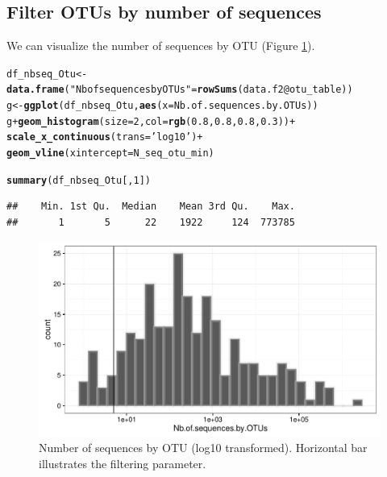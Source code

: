 \documentclass[12pt]{article}\usepackage[]{graphicx}\usepackage[]{color}
\makeatletter
\def\maxwidth{ %
  \ifdim\Gin@nat@width>\linewidth
    \linewidth
  \else
    \Gin@nat@width
  \fi
}
\newcommand{\hlnum}[1]{\textcolor[rgb]{0.686,0.059,0.569}{#1}}%
\newcommand{\hlstr}[1]{\textcolor[rgb]{0.192,0.494,0.8}{#1}}%
\newcommand{\hlopt}[1]{\textcolor[rgb]{0,0,0}{#1}}%
\newcommand{\hlstd}[1]{\textcolor[rgb]{0.345,0.345,0.345}{#1}}%
\newcommand{\hlkwb}[1]{\textcolor[rgb]{0.69,0.353,0.396}{#1}}%
\newcommand{\hlkwc}[1]{\textcolor[rgb]{0.333,0.667,0.333}{#1}}%
\newcommand{\hlkwd}[1]{\textcolor[rgb]{0.737,0.353,0.396}{\textbf{#1}}}%
\newenvironment{kframe}{%
 \def\at@end@of@kframe{}%
 \ifinner\ifhmode%
  \def\at@end@of@kframe{\end{minipage}}%
  \begin{minipage}{\columnwidth}%
 \fi\fi%
 \def\FrameCommand##1{\hskip\@totalleftmargin \hskip-\fboxsep
 \colorbox{shadecolor}{##1}\hskip-\fboxsep
     \hskip-\linewidth \hskip-\@totalleftmargin \hskip\columnwidth}%
 \MakeFramed {\advance\hsize-\width
   \@totalleftmargin\z@ \linewidth\hsize
   \@setminipage}}%
 {\par\unskip\endMakeFramed%
 \at@end@of@kframe}
\newenvironment{knitrout}{}{} %
\numberwithin{figure}{section}
\makeatother
\begin{document}
 \subsection{Filter OTUs by number of sequences}

 We can visualize the number of sequences by OTU (Figure \ref{fig:nbseq_Otu}).

\begin{knitrout}\small
{}\color{fgcolor}\begin{kframe}
\begin{alltt}
\hlstd{df_nbseq_Otu} \hlkwb{<-} \hlkwd{data.frame}\hlstd{(}\hlstr{"Nb of sequences by OTUs"} \hlstd{=} \hlkwd{rowSums}\hlstd{(data.f2}\hlopt{@}\hlkwc{otu_table}\hlstd{))}
\hlstd{g} \hlkwb{<-} \hlkwd{ggplot}\hlstd{(df_nbseq_Otu,} \hlkwd{aes}\hlstd{(}\hlkwc{x} \hlstd{= Nb.of.sequences.by.OTUs))}
\hlstd{g} \hlopt{+} \hlkwd{geom_histogram}\hlstd{(}\hlkwc{size} \hlstd{=} \hlnum{2}\hlstd{,} \hlkwc{col} \hlstd{=} \hlkwd{rgb}\hlstd{(}\hlnum{0.8}\hlstd{,} \hlnum{0.8}\hlstd{,} \hlnum{0.8}\hlstd{,} \hlnum{0.3}\hlstd{))} \hlopt{+}
  \hlkwd{scale_x_continuous}\hlstd{(}\hlkwc{trans} \hlstd{=} \hlstr{'log10'}\hlstd{)} \hlopt{+}
  \hlkwd{geom_vline}\hlstd{(}\hlkwc{xintercept}\hlstd{= N_seq_otu_min)}
\end{alltt}


{\ttfamily\noindent\itshape\color{messagecolor}{\#\# `stat\_bin()` using `bins = 30`. Pick better value with `binwidth`.}}\begin{alltt}
\hlkwd{summary}\hlstd{(df_nbseq_Otu[,} \hlnum{1}\hlstd{])}
\end{alltt}
\begin{verbatim}
##    Min. 1st Qu.  Median    Mean 3rd Qu.    Max. 
##       1       5      22    1922     124  773785
\end{verbatim}
\end{kframe}\begin{figure}

{\centering \includegraphics[width=\maxwidth]{figure/nbseq_Otu-1} 

}

\caption[Number of sequences by OTU (log10 transformed)]{Number of sequences by OTU (log10 transformed). Horizontal bar illustrates the filtering parameter.}\label{fig:nbseq_Otu}
\end{figure}


\end{knitrout}
\end{document}
